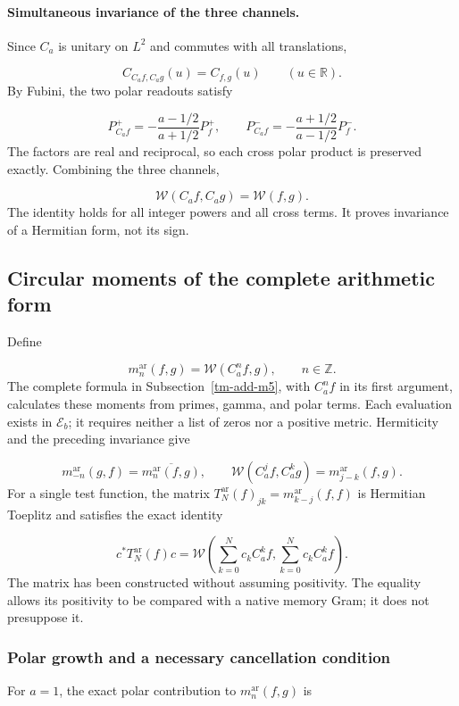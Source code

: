 \paragraph{Simultaneous invariance of the three channels.}
\label{tm-add:invariancia-weil} Since \(C_a\) is unitary on \(L^2\) and commutes with all translations,

\[
C_{C_af,C_ag}(u)=C_{f,g}(u)\qquad(u\in\mathbb R).
\]
By Fubini, the two polar readouts satisfy

\[
P_{C_af}^+=-\frac{a-1/2}{a+1/2}P_f^+,
\qquad
P_{C_af}^-=-\frac{a+1/2}{a-1/2}P_f^-.
\]
The factors are real and reciprocal, so each cross polar product is preserved exactly. Combining the three channels,

\[
\boxed{\mathscr W(C_af,C_ag)=\mathscr W(f,g).}
\]
The identity holds for all integer powers and all cross terms. It proves invariance of a Hermitian form, not its sign.


\subsection{Circular moments of the complete arithmetic form}
\label{tm-add-m6}
Define

\[
m_n^{\mathrm{ar}}(f,g)=\mathscr W(C_a^n f,g),\qquad n\in\mathbb Z.
\]
The complete formula in Subsection~\ref{tm-add-m5}, with \(C_a^nf\) in its first argument, calculates these moments from primes, gamma, and polar terms. Each evaluation exists in \(\mathscr E_b\); it requires neither a list of zeros nor a positive metric. Hermiticity and the preceding invariance give

\[
m_{-n}^{\mathrm{ar}}(g,f)=\overline{m_n^{\mathrm{ar}}(f,g)},\qquad
\mathscr W(C_a^j f,C_a^k g)=m_{j-k}^{\mathrm{ar}}(f,g).
\]
For a single test function, the matrix \(T_N^{\mathrm{ar}}(f)_{jk}=m_{k-j}^{\mathrm{ar}}(f,f)\) is Hermitian Toeplitz and satisfies the exact identity

\[
c^*T_N^{\mathrm{ar}}(f)c
=\mathscr W\!\left(\sum_{k=0}^N c_k C_a^k f,
                    \sum_{k=0}^N c_k C_a^k f\right).
\]
The matrix has been constructed without assuming positivity. The equality allows its positivity to be compared with a native memory Gram; it does not presuppose it.


\subsubsection{Polar growth and a necessary cancellation condition}
\label{tm-add-m6-1}
For \(a=1\), the exact polar contribution to \(m_n^{\mathrm{ar}}(f,g)\) is

